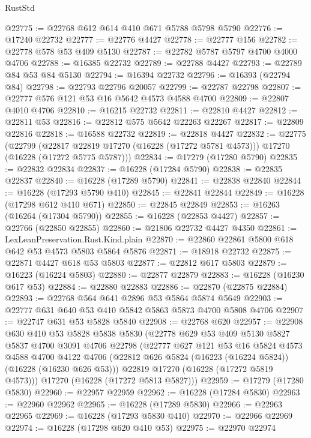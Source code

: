 \begin{lexlean}{RustStd}
\begin{coremodule}
@22775 := @22768 @612 @614 @410 @671 @5788 @5798 @5790
@22776 := @17240 @22732
@22777 := @22776 @4427
@22778 := @22777 @156
@22782 := @22778 @578 @53 @409 @5130
@22787 := @22782 @5787 @5797 @4700 @4000 @4706
@22788 := @16385 @22732
@22789 := @22788 @4427
@22793 := @22789 @84 @53 @84 @5130
@22794 := @16394 @22732
@22796 := @16393 (@22794 @84)
@22798 := @22793 @22796 @20057
@22799 := @22787 @22798
@22807 := @22777 @576 @121 @53 @16 @5642 @4573 @4588 @4700
@22809 := @22807 @4010 @4706
@22810 := @16215 @22732
@22811 := @22810 @4427
@22812 := @22811 @53
@22816 := @22812 @575 @5642 @22263 @22267
@22817 := @22809 @22816
@22818 := @16588 @22732
@22819 := @22818 @4427
@22832 := @22775
    (@22799
      (@22817 @22819 @17270 (@16228 (@17272 @5781 @4573)))
      @17270
      (@16228 (@17272 @5775 @5787)))
@22834 := @17279 (@17280 @5790)
@22835 := @22832 @22834
@22837 := @16228 (@17284 @5790)
@22838 := @22835 @22837
@22840 := @16228 (@17289 @5790)
@22841 := @22838 @22840
@22844 := @16228 (@17293 @5790 @410)
@22845 := @22841 @22844
@22849 := @16228 (@17298 @612 @410 @671)
@22850 := @22845 @22849
@22853 := @16263 (@16264 (@17304 @5790))
@22855 := @16228 (@22853 @4427)
@22857 := @22766 (@22850 @22855)
@22860 := @21806 @22732 @4427 @4350
@22861 := LexLeanPreservation.Rust.Kind.plain
@22870 := @22860 @22861 @5800 @618 @642 @53 @4573 @5803 @5864 @5876
@22871 := @18918 @22732
@22875 := @22871 @4427 @618 @53 @5803
@22877 := @22812 @617 @5803
@22879 := @16223 (@16224 @5803)
@22880 := @22877 @22879
@22883 := @16228 (@16230 @617 @53)
@22884 := @22880 @22883
@22886 := @22870 (@22875 @22884)
@22893 := @22768 @564 @641 @2896 @53 @5864 @5874 @5649
@22903 := @22777 @631 @640 @53 @410 @5842 @5863 @5873 @4700 @5808 @4706
@22907 := @22747 @631 @53 @5828 @5840
@22908 := @22768 @620
@22957 := @22908
    @630
    @410
    @53
    @5828
    @5838
    @5830
    (@22778
      @629
      @53
      @409
      @5130
      @5827
      @5837
      @4700
      @3091
      @4706
      @22798
      (@22777
        @627
        @121
        @53
        @16
        @5824
        @4573
        @4588
        @4700
        @4122
        @4706
        (@22812 @626 @5824 (@16223 (@16224 @5824)) (@16228 (@16230 @626 @53)))
        @22819
        @17270
        (@16228 (@17272 @5819 @4573)))
      @17270
      (@16228 (@17272 @5813 @5827)))
@22959 := @17279 (@17280 @5830)
@22960 := @22957 @22959
@22962 := @16228 (@17284 @5830)
@22963 := @22960 @22962
@22965 := @16228 (@17289 @5830)
@22966 := @22963 @22965
@22969 := @16228 (@17293 @5830 @410)
@22970 := @22966 @22969
@22974 := @16228 (@17298 @620 @410 @53)
@22975 := @22970 @22974

\end{coremodule}
\end{lexlean}
